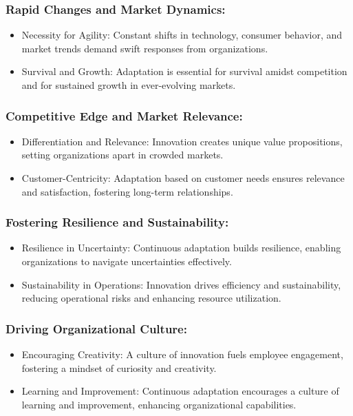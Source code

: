 \documentclass[a4paper, twoside]{article}
\begin{document}
\subsubsection{Rapid Changes and Market Dynamics:}
\begin{itemize}
    \item Necessity for Agility: Constant shifts in technology, consumer behavior, and market trends demand swift responses from organizations.
    \item Survival and Growth: Adaptation is essential for survival amidst competition and for sustained growth in ever-evolving markets.
\end{itemize}

\subsubsection{Competitive Edge and Market Relevance:}
\begin{itemize}
    \item Differentiation and Relevance: Innovation creates unique value propositions, setting organizations apart in crowded markets.
    \item Customer-Centricity: Adaptation based on customer needs ensures relevance and satisfaction, fostering long-term relationships.
\end{itemize}

\subsubsection{Fostering Resilience and Sustainability:}
\begin{itemize}
    \item Resilience in Uncertainty: Continuous adaptation builds resilience, enabling organizations to navigate uncertainties effectively.
    \item Sustainability in Operations: Innovation drives efficiency and sustainability, reducing operational risks and enhancing resource utilization.
\end{itemize}

\subsubsection{Driving Organizational Culture:}
\begin{itemize}
    \item Encouraging Creativity: A culture of innovation fuels employee engagement, fostering a mindset of curiosity and creativity.
    \item Learning and Improvement: Continuous adaptation encourages a culture of learning and improvement, enhancing organizational capabilities.
\end{itemize}
\end{document}
